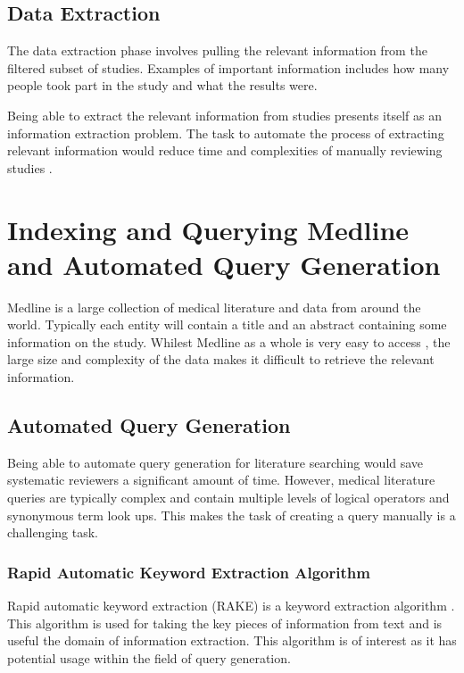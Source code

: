 \subsection{Data Extraction}

The data extraction phase involves pulling the relevant information from the filtered subset of studies. Examples of important information includes how many people took part in the study and what the results were.

Being able to extract the relevant information from studies presents itself as an information extraction problem. The task to automate the process of extracting relevant information would reduce time and complexities of manually reviewing studies \cite{Siddhartha2015}.


\section{Indexing and Querying Medline and Automated Query Generation} \label{medlinelit}

Medline is a large collection of medical literature and data from around the world. Typically each entity will contain a title and an abstract containing some information on the study. Whilest Medline as a whole is very easy to access \cite{medline}, the large size and complexity of the data makes it difficult to retrieve the relevant information.

\subsection{Automated Query Generation} \label{aqglit}

Being able to automate query generation for literature searching would save systematic reviewers a significant amount of time. However, medical literature queries are typically complex and contain multiple levels of logical operators and synonymous term look ups. This makes the task of creating a query manually is a challenging task.

\subsubsection{Rapid Automatic Keyword Extraction Algorithm} \label{rakelit}

Rapid automatic keyword extraction (RAKE) is a keyword extraction algorithm \cite{rake}. This algorithm is used for taking the key pieces of information from text and is useful the domain of information extraction. This algorithm is of interest as it has potential usage within the field of query generation.

